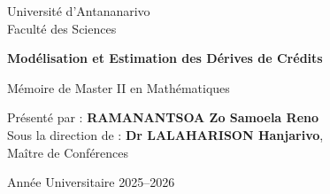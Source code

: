 
\begin{titlepage}
    \centering

    {\Large Université d'Antananarivo \\ Faculté des Sciences}

    \vfill

    {\Huge \textbf{Modélisation et Estimation des Dérives de Crédits}}

    \vspace{1cm}

    {\Large Mémoire de Master II en Mathématiques}

    \vfill

    \begin{flushright}
        \large
        Présenté par : \textbf{RAMANANTSOA Zo Samoela Reno} \\
        Sous la direction de : \textbf{Dr LALAHARISON Hanjarivo}, \\Maître de Conférences
    \end{flushright}

    \vfill

    {\large Année Universitaire 2025–2026}

\end{titlepage}

